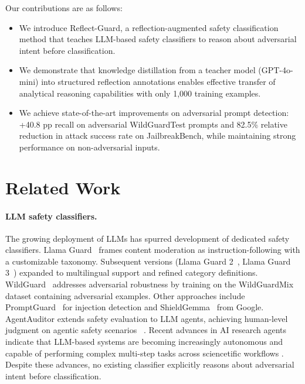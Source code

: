 \documentclass[Superintelligence,article,submit,pdftex,moreauthors]{Definitions/mdpi}
\begin{document}
Our contributions are as follows:
\begin{itemize}[leftmargin=*, nosep]
  \item We introduce Reflect-Guard, a reflection-augmented safety classification method that teaches LLM-based safety classifiers to reason about adversarial intent before classification.
  \item We demonstrate that knowledge distillation from a teacher model (GPT-4o-mini) into structured reflection annotations enables effective transfer of analytical reasoning capabilities with only 1{,}000 training examples.
  \item We achieve state-of-the-art improvements on adversarial prompt detection: +40.8 pp recall on adversarial WildGuardTest prompts and 82.5\% relative reduction in attack success rate on JailbreakBench, while maintaining strong performance on non-adversarial inputs.
\end{itemize}

\section{Related Work}

\paragraph{LLM safety classifiers.}
The growing deployment of LLMs has spurred development of dedicated safety classifiers. Llama Guard~\citep{inan2023llamaguard} frames content moderation as instruction-following with a customizable taxonomy. Subsequent versions (Llama Guard 2~\citep{metallamaguard2}, Llama Guard 3~\citep{metallamaguard3}) expanded to multilingual support and refined category definitions. WildGuard~\citep{han2024wildguard} addresses adversarial robustness by training on the WildGuardMix dataset containing adversarial examples. Other approaches include PromptGuard~\citep{meta2024promptguard} for injection detection and ShieldGemma~\citep{zeng2024shieldgemma} from Google. AgentAuditor extends safety evaluation to LLM agents, achieving human-level judgment on agentic safety scenarios ~\citep{luo2025agentauditor}. Recent advances in AI research agents indicate that LLM-based systems are becoming increasingly autonomous and capable of performing complex multi-step tasks across sciencetific workflows \citep{kong2026aiautoresearch}. Despite these advances, no existing classifier explicitly reasons about adversarial intent before classification.
\end{document}
